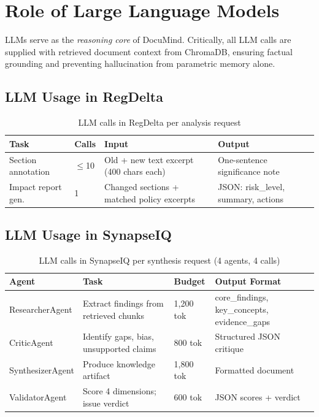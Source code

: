 \documentclass[12pt,letterpaper]{article}
\begin{document}
\section{Role of Large Language Models}

LLMs serve as the \emph{reasoning core} of DocuMind. Critically, all LLM calls are supplied
with retrieved document context from ChromaDB, ensuring factual grounding and preventing
hallucination from parametric memory alone.

\subsection{LLM Usage in RegDelta}

\begin{table}[h!]
\centering
\begin{tabular}{L{3.5cm} C{1.5cm} L{3.5cm} L{4.5cm}}
\toprule
\textbf{Task} & \textbf{Calls} & \textbf{Input} & \textbf{Output} \\
\midrule
Section annotation    & $\leq$10 & Old + new text excerpt (400 chars each) & One-sentence significance note \\
Impact report gen.    & 1        & Changed sections + matched policy excerpts & JSON: risk\_level, summary, actions \\
\bottomrule
\end{tabular}
\caption{LLM calls in RegDelta per analysis request}
\end{table}

\subsection{LLM Usage in SynapseIQ}

\begin{table}[h!]
\centering
\begin{tabular}{L{3.5cm} L{4.5cm} C{2cm} L{3.2cm}}
\toprule
\textbf{Agent} & \textbf{Task} & \textbf{Budget} & \textbf{Output Format} \\
\midrule
ResearcherAgent  & Extract findings from retrieved chunks & 1,200 tok & core\_findings, key\_concepts, evidence\_gaps \\
CriticAgent      & Identify gaps, bias, unsupported claims & 800 tok   & Structured JSON critique \\
SynthesizerAgent & Produce knowledge artifact             & 1,800 tok & Formatted document \\
ValidatorAgent   & Score 4 dimensions; issue verdict      & 600 tok   & JSON scores + verdict \\
\bottomrule
\end{tabular}
\caption{LLM calls in SynapseIQ per synthesis request (4 agents, 4 calls)}
\end{table}
\end{document}

